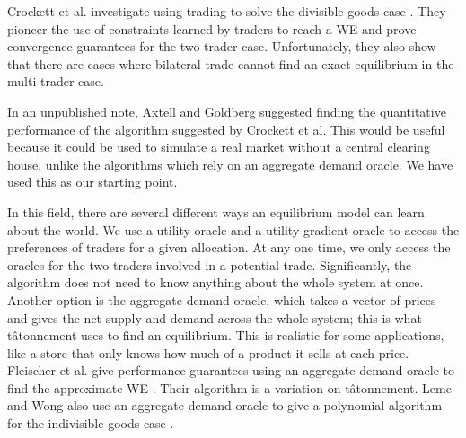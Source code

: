 \documentclass[12pt,a4paper,titlepage]{article}
\begin{document}
Crockett et al. investigate using trading to solve the divisible goods case \cite{crockett}.
They pioneer the use of constraints learned by traders to reach a WE and prove convergence guarantees for the two-trader case.
Unfortunately, they also show that there are cases where bilateral trade cannot find an exact equilibrium in the multi-trader case.

In an unpublished note, Axtell and Goldberg \cite{goldberg} suggested finding the quantitative performance of the algorithm suggested by Crockett et al.
This would be useful because it could be used to simulate a real market without a central clearing house, unlike the algorithms which rely on an aggregate demand oracle.
We have used this as our starting point.


In this field, there are several different ways an equilibrium model can learn about the world. 
We use a utility oracle and a utility gradient oracle to access the preferences of traders for a given allocation.
At any one time, we only access the oracles for the two traders involved in a potential trade.
Significantly, the algorithm does not need to know anything about the whole system at once.
Another option is the aggregate demand oracle, which takes a vector of prices and gives the net supply and demand across the whole system; this is what tâtonnement uses to find an equilibrium.
This is realistic for some applications, like a store that only knows how much of a product it sells at each price.
Fleischer et al. give performance guarantees using an aggregate demand oracle to find the approximate WE \cite{fleischer}.
Their algorithm is a variation on tâtonnement.
Leme and Wong also use an aggregate demand oracle to give a polynomial algorithm for the indivisible goods case \cite{leme}.

\clearpage
\end{document}
